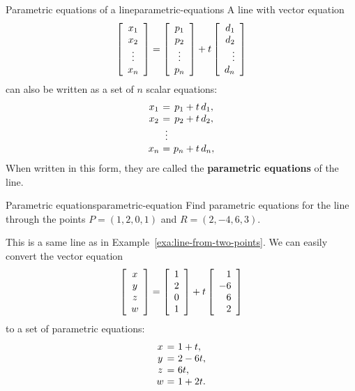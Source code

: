 \documentclass{ximera}
\begin{document}
\begin{definition}{Parametric equations of a line}{parametric-equations}
  A line with vector equation
  \begin{equation*}
    \startmat{c} x_1 \\ x_2 \\ \vdots \\ x_n \stopmat
    = \startmat{c} p_1 \\ p_2 \\ \vdots \\ p_n \stopmat
    + t \startmat{r} d_1 \\ d_2 \\ \vdots \\ d_n \stopmat
  \end{equation*}
  can also be written as a set of $n$ scalar equations:
  \begin{equation*}
    \begin{array}{c@{~}c@{~}c}
      x_1 &=& p_1 + t\,d_1, \\
      x_2 &=& p_2 + t\,d_2, \\
          &\vdots&             \\
      x_n &=& p_n + t\,d_n,
    \end{array}
  \end{equation*}
  When written in this form, they are called the \textbf{parametric
    equations}%
   of the line.
\end{definition}

\begin{example}{Parametric equations}{parametric-equation}
  Find parametric equations for the line through the points
  $P = (1,2,0,1)$ and $R = (2,-4,6,3)$.
\end{example}

\begin{solution}
  This is a same line as in Example~\ref{exa:line-from-two-points}. We
  can easily convert the vector equation
  \begin{equation*}
    \startmat{c} x \\ y \\ z \\ w \stopmat
    = \startmat{c} 1 \\ 2 \\ 0 \\ 1\stopmat
    + t \startmat{r} 1 \\ -6 \\ 6 \\ 2\stopmat
  \end{equation*}
  to a set of parametric equations:
  \begin{equation*}
    \begin{array}{c@{~}c@{~}l}
      x &=& 1 + t, \\
      y &=& 2 - 6t, \\
      z &=& 6t, \\
      w &=& 1 + 2t.
    \end{array}
  \end{equation*}
\end{solution}
\end{document}
